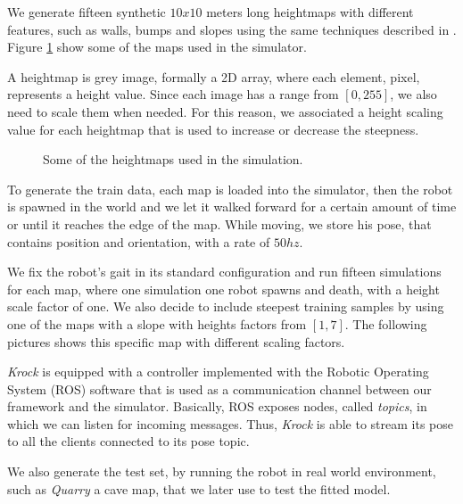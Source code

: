 \documentclass[../document.tex]{subfiles}
\begin{document}
We generate fifteen synthetic $10x10$ meters long heightmaps with different features, such as walls, bumps and slopes using the same techniques described in \cite{omar2018traversability}. Figure \ref{fig:heightmaps}
show some of the maps used in the simulator. 

A heightmap is grey image, formally a 2D array, where each element, pixel, represents a height value. Since each image has a range from $[0,255]$, we also need to scale them when needed. For this reason, we associated a height scaling value for each heightmap that is used to increase or decrease the steepness. 


\begin{figure}[H]
\label{fig:heightmaps}
\caption{Some of the heightmaps used in the simulation.}
\end{figure}

To generate the train data, each map is loaded into the simulator, then the robot is spawned in the world and we let it walked forward for a certain amount of time or until it reaches the edge of the map. While moving, we store his pose, that contains position and orientation, with a rate of $50hz$. 

We fix the robot's gait in its standard configuration and run fifteen simulations for each map, where one simulation one robot spawns and death, with a height scale factor of one. We also decide to include steepest training samples by using one of the maps with a slope with heights factors from $[1,7]$. The following pictures shows this specific map with different scaling factors. 


\emph{Krock} is equipped with a controller implemented with the Robotic Operating System (ROS) software that is used as a communication channel between our framework and the simulator. Basically, ROS exposes nodes, called \emph{topics}, in which we can listen for incoming messages. Thus, \emph{Krock} is able to stream its pose to all the clients connected to its pose topic. 

We also generate the test set, by running the robot in real world environment, such as \emph{Quarry} a cave map, that we later use to test the fitted model. 
\end{document}

